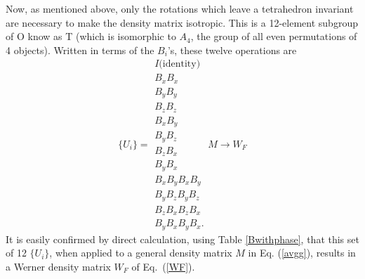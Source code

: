 Now, as mentioned above, only the rotations which leave a tetrahedron
invariant are necessary to make the density matrix isotropic.  This is
a 12-element subgroup of O know as T (which is isomorphic to
$A_4$, the group of all even permutations of 4 objects).  Written in
terms of the $B_i$'s, these twelve operations are
\begin{equation}
\{U_i\}=
\begin{array}{l}
I  \mbox{(identity)}\\
B_xB_x\\
B_yB_y\\
B_zB_z\\
B_xB_y\\
B_yB_z\\
B_zB_x\\
B_yB_x\\
B_xB_yB_xB_y\\
B_yB_zB_yB_z\\
B_zB_xB_zB_x\\
B_yB_xB_yB_x.\end{array}M\rightarrow W_F
\end{equation}
It is easily confirmed by direct calculation, using Table
\ref{Bwithphase}, that this set of 12 $\{U_i\}$, when applied to a
general density matrix $M$ in Eq. (\ref{avgg}), results in a Werner
density matrix $W_F$ of Eq.~(\ref{WF}).
 
